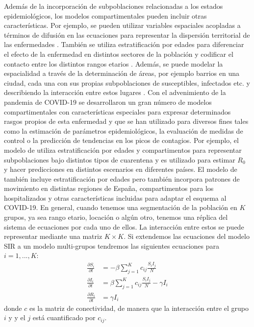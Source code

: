 Además de la incorporación de subpoblaciones relacionadas a los estados epidemiológicos, los modelos compartimentales pueden incluir otras características. Por ejemplo, se pueden utilizar variables espaciales acopladas a términos de difusión en las ecuaciones para representar la dispersión territorial de las enfermedades \citep{Noble1974}. También se utiliza estratificación por edades para diferenciar el efecto de la enfermedad en distintos sectores de la población y codificar el contacto entre los distintos rangos etarios \citep{Hethcote2000}. Además, se puede modelar la espacialidad a través de la determinación de áreas, por ejemplo barrios en una ciudad, cada una con sus propias subpoblaciones de susceptibles, infectados etc. y describiendo la interacción entre estos lugares \citep{Klepac2018}. Con el advenimiento de la pandemia de COVID-19 se desarrollaron un gran número de modelos compartimentales con características especiales para expresar determinados rasgos propios de esta enfermedad y que se han utilizado para diversos fines tales como la estimación de parámetros epidemiológicos, la evaluación de medidas de control o la predicción de tendencias en los picos de contagios. Por ejemplo, el modelo de \cite{Evensen2020} utiliza estratificación por edades y compartimentos para representar subpoblaciones bajo distintos tipos de cuarentena y es utilizado para estimar $R_0$ y hacer predicciones en distintos escenarios en diferentes países. El modelo de \cite{Arenas2020} también incluye estratificación por edades pero también incorpora patrones de movimiento en distintas regiones de España, compartimentos para los hospitalizados y otras características incluidas para adaptar el esquema al COVID-19. En general, cuando tenemos una segmentación de la población en $K$ grupos, ya sea rango etario, locación o algún otro, tenemos una réplica del sistema de ecuaciones por cada uno de ellos. La interacción entre estos se puede representar mediante una matriz $K \times K$. Si extendemos las ecuaciones del modelo SIR a un modelo multi-grupos tendremos las siguientes ecuaciones para $i=1, ..., K$:
\begin{align}
    \frac{\partial S_i}{\partial t} &= -\beta \sum_{j=1}^{K}c_{ij}\frac{S_i I_j}{N}\\
    \frac{\partial I_i}{\partial t} &= \beta \sum_{j=1}^{K}c_{ij}\frac{S_i I_j}{N} - \gamma I_i \\
    \frac{\partial R_i}{\partial t} &= \gamma I_i
\end{align}
donde $c$ es la matriz de conectividad, de manera que la interacción entre el grupo $i$ y y el $j$ está cuantificado por $c_{ij}$.

